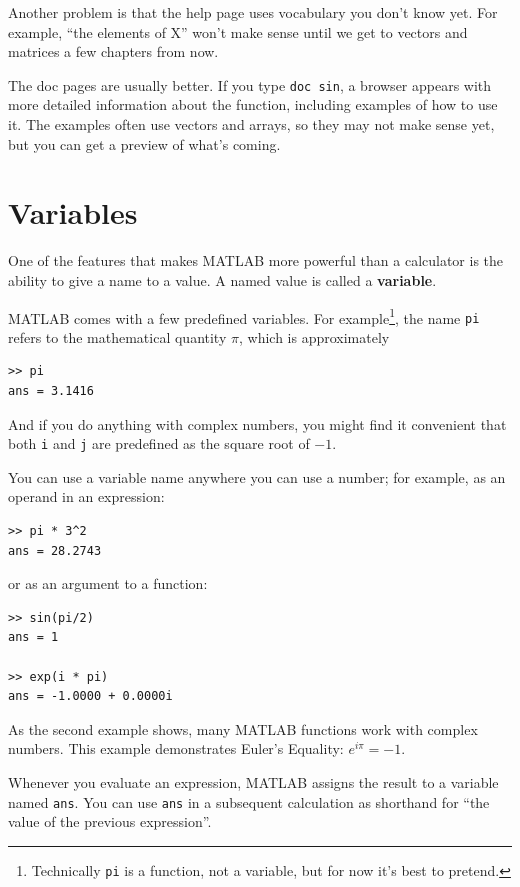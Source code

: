 \documentclass{book}
\begin{document}
Another problem is that the help page uses vocabulary you don't
know yet.  For example, ``the elements of X'' won't make sense until
we get to vectors and matrices a few chapters from now.

The doc pages are usually better.  If you type {\tt doc sin}, a
browser appears with more detailed information about the
function, including examples of how to use it.  The examples often
use vectors and arrays, so they may not make sense yet, but you can
get a preview of what's coming.


\section{Variables}

One of the features that makes MATLAB more powerful than a calculator
is the ability to give a name to a value.  A named value is called
a {\bf variable}.

MATLAB comes with a few predefined variables.  For
example\footnote{Technically {\tt pi} is a function, not a variable,
but for now it's best to pretend.}, the name {\tt pi} refers to the
mathematical quantity $\pi$, which is approximately

\begin{verbatim}
>> pi
ans = 3.1416
\end{verbatim}

And if you do anything with complex numbers, you might find it
convenient that both {\tt i} and {\tt j} are predefined as the square
root of $-1$.

You can use a variable name anywhere you can use a number; for example, as
an operand in an expression:

\begin{verbatim}
>> pi * 3^2
ans = 28.2743
\end{verbatim}

or as an argument to a function:

\begin{verbatim}
>> sin(pi/2)
ans = 1

>> exp(i * pi)
ans = -1.0000 + 0.0000i
\end{verbatim}

As the second example shows, many MATLAB functions work with
complex numbers.  This example demonstrates Euler's Equality:
$e^{i \pi} = -1$.

Whenever you evaluate an expression, MATLAB assigns the result to
a variable named {\tt ans}.  You can use {\tt ans} in a subsequent
calculation as shorthand for ``the value of the previous expression''.
\end{document}
